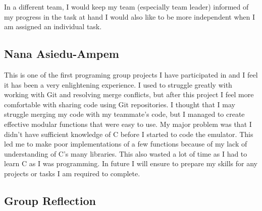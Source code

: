 \documentclass[11pt]{article}
\begin{document}
In a different team, I would keep my team (especially team leader) informed of
my progress in the task at hand I would also like to be more independent when I
am assigned an individual task.

\subsection{Nana Asiedu-Ampem}
This is one of the first programing group projects I have participated in and I feel it has been a very enlightening experience. I used to struggle greatly with working with Git and resolving merge conflicts, but after this project I feel more comfortable with sharing code using Git repositories. I thought that I may struggle merging my code with my teammate's code, but I managed to create effective modular functions that were easy to use. My major problem was that I didn't have sufficient knowledge of C before I started to code the emulator. This led me to make poor implementations of a few functions because of my lack of understanding of C's many libraries. This also wasted a lot of time as I had to learn C as I was programming. In future I will ensure to prepare my skills for any projects or tasks I am required to complete. \newline

\subsection{Group Reflection}
\end{document}
